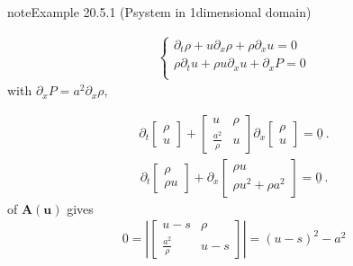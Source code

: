 \documentclass[letterpaper,10pt,english]{jupyterBook}
\begin{document}
\begin{sphinxadmonition}{note}{Example 20.5.1 (P\sphinxhyphen{}system in 1\sphinxhyphen{}dimensional domain)}


\begin{equation*}
\begin{split}\begin{cases}
 \partial_t \rho + u \partial_x \rho + \rho \partial_x u = 0 \\
 \rho \partial_t u + \rho u \partial_x u + \partial_x P = 0 \\
\end{cases}\end{split}
\end{equation*}
\sphinxAtStartPar
with \(\partial_x P = a^2 \partial_x \rho\),

\sphinxAtStartPar
{}
\begin{equation*}
\begin{split}\partial_t \begin{bmatrix} \rho \\ u \end{bmatrix} + \begin{bmatrix} u & \rho \\ \frac{a^2}{\rho} & u \end{bmatrix} \partial_x \begin{bmatrix} \rho \\ u \end{bmatrix} = \underline{0} \ .\end{split}
\end{equation*}
\sphinxAtStartPar
{}
\begin{equation*}
\begin{split}\partial_t \begin{bmatrix} \rho \\ \rho u \end{bmatrix} + \partial_x \begin{bmatrix} \rho u \\ \rho u^2 + \rho a^2 \end{bmatrix} = \underline{0} \ .\end{split}
\end{equation*}
\sphinxAtStartPar
{} of \(\mathbf{A}(\mathbf{u})\) gives
\begin{equation*}
\begin{split}0 = \left| \begin{bmatrix} u - s & \rho \\ \frac{a^2}{\rho} & u - s \end{bmatrix} \right| = (u - s)^2  - a^2\end{split}

\end{equation*}
\end{sphinxadmonition}
\end{document}
